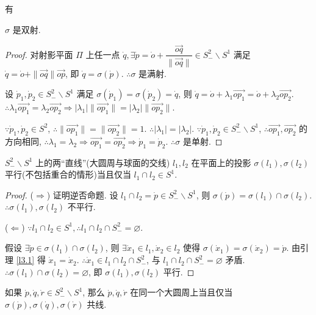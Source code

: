 \documentclass{ctexart}
\begin{document}
有
\begin{lemma}\label{l3.1}
    $\sigma$ 是双射.
\end{lemma}
\begin{proof}
    对射影平面 $\varPi$ 上任一点 $\dot{q},\exists\dot{p}=\dot{o}+\dfrac{\overrightarrow{oq}}{\|\overrightarrow{oq}\|}\in S^2_-\backslash S^1$ 满足 $\dot{q}=\dot{o}+\|\overrightarrow{oq}\|\overrightarrow{op}$, 即 $\dot{q}=\sigma(\dot{p})$. $\therefore\sigma$ 是满射.
    
    设 $\dot{p}_1,\dot{p}_2\in S^2_-\backslash S^1$ 满足 $\sigma(\dot{p}_1)=\sigma(\dot{p}_2)=\dot{q}$, 则 $\dot{q}=\dot{o}+\lambda_1\overrightarrow{op_1}=\dot{o}+\lambda_2\overrightarrow{op_2}$. $\therefore\lambda_1\overrightarrow{op_1}=\lambda_2\overrightarrow{op_2}\Rightarrow|\lambda_1|\|\overrightarrow{op_1}\|=|\lambda_2|\|\overrightarrow{op_2}\|$.
    
    $\because\dot{p}_1,\dot{p}_2\in S^2$, $\therefore\|\overrightarrow{op_1}\|=\|\overrightarrow{op_2}\|=1$. $\therefore|\lambda_1|=|\lambda_2|$. $\because\dot{p}_1,\dot{p}_2\in S^2_-\backslash S^1$, $\therefore\overrightarrow{op_1},\overrightarrow{op_2}$ 的方向相同, $\therefore\lambda_1=\lambda_2\Rightarrow\overrightarrow{op_1}=\overrightarrow{op_2}\Rightarrow\dot{p}_1=\dot{p}_2$. $\therefore\sigma$ 是单射.
\end{proof}
\begin{theorem}
    $S^2_-\backslash S^1$ 上的两``直线''(大圆周与球面的交线) $l_1,l_2$ 在平面上的投影 $\sigma(l_1),\sigma(l_2)$ 平行(不包括重合的情形)当且仅当 $l_1\cap l_2\in S^1$.
\end{theorem}
\begin{proof}
    ($\Rightarrow$) 证明逆否命题. 设 $l_1\cap l_2=\dot{p}\in S^2_-\backslash S^1$, 则 $\sigma(\dot{p})=\sigma(l_1)\cap\sigma(l_2)$. $\therefore\sigma(l_1),\sigma(l_2)$ 不平行.
    
    ($\Leftarrow$) $\because l_1\cap l_2\in S^1,\therefore l_1\cap l_2\cap S^2_-=\varnothing$.

    假设 $\exists\dot{p}\in\sigma(l_1)\cap\sigma(l_2)$, 则 $\exists\dot{x}_1\in l_1,\dot{x}_2\in l_2$ 使得 $\sigma(\dot{x}_1)=\sigma(\dot{x}_2)=\dot{p}$. 由引理 \ref{l3.1} 得 $\dot{x}_1=\dot{x}_2$. $\therefore\dot{x}_1\in l_1\cap l_2\cap S^2_-$, 与 $l_1\cap l_2\cap S^2_-=\varnothing$ 矛盾. $\therefore\sigma(l_1)\cap\sigma(l_2)=\varnothing$, 即 $\sigma(l_1),\sigma(l_2)$ 平行.
\end{proof}
\begin{theorem}
    如果 $\dot{p},\dot{q},\dot{r}\in S^2_-\backslash S^1$, 那么 $\dot{p},\dot{q},\dot{r}$ 在同一个大圆周上当且仅当 $\sigma(\dot{p}),\sigma(\dot{q}),\sigma(\dot{r})$ 共线.
\end{theorem}
\end{document}

